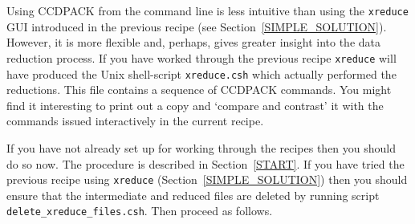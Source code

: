 \documentclass[twoside,11pt]{starlink}
\begin{document}
Using CCDPACK from the command line is less intuitive than using the
\texttt{xreduce} GUI introduced in the previous recipe (see
Section~\ref{SIMPLE_SOLUTION}).  However, it is more flexible and,
perhaps, gives greater insight into the data reduction process.  If you
have worked through the previous recipe \texttt{xreduce} will have produced
the Unix shell-script \texttt{xreduce.csh} which actually performed the
reductions.  This file contains a sequence of CCDPACK commands.  You
might find it interesting to print out a copy and `compare and contrast'
it with the commands issued interactively in the current recipe.

If you have not already set up for working through the recipes then
you should do so now.  The procedure is described in Section~\ref{START}.
If you have tried the previous recipe using \texttt{xreduce}
(Section~\ref{SIMPLE_SOLUTION}) then you should ensure that the
intermediate and reduced files are deleted by running script \texttt{delete\_xreduce\_files.csh}.  Then proceed as follows.
\end{document}
